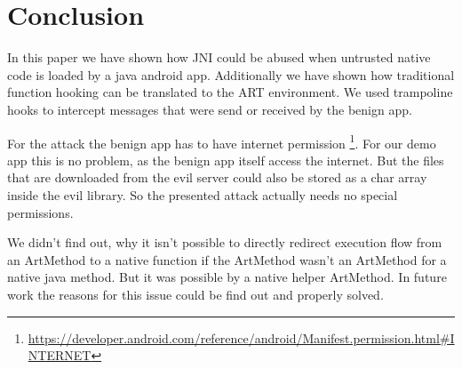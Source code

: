 
\section{Conclusion}

In this paper we have shown how JNI could be abused when untrusted native code is loaded by a java android app. Additionally we have shown how traditional function hooking can be translated to the ART environment. We used trampoline hooks to intercept messages that were send or received by the benign app.

For the attack the benign app has to have internet permission \footnote{\url{https://developer.android.com/reference/android/Manifest.permission.html\#INTERNET}}. For our demo app this is no problem, as the benign app itself access the internet. But the files that are downloaded from the evil server could also be stored as a char array inside the evil library. So the presented attack actually needs no special permissions.

We didn't find out, why it isn't possible to directly redirect execution flow from an ArtMethod to a native function if the ArtMethod wasn't an ArtMethod for a native java method. But it was possible by a native helper ArtMethod. In future work the reasons for this issue could be find out and properly solved. 